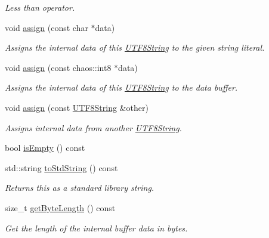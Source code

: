 \begin{DoxyCompactItemize}
\begin{DoxyCompactList}\small\item\em Less than operator. \end{DoxyCompactList}\item 
void \hyperlink{classchaos_1_1str_1_1_u_t_f8_string_a483e71ec1090e346c63bf2b13b37ad7a}{assign} (const char $\ast$data)
\begin{DoxyCompactList}\small\item\em Assigns the internal data of this \hyperlink{classchaos_1_1str_1_1_u_t_f8_string}{U\-T\-F8\-String} to the given string literal. \end{DoxyCompactList}\item 
void \hyperlink{classchaos_1_1str_1_1_u_t_f8_string_a861874ab4bff725c9c10b20a14533221}{assign} (const chaos\-::int8 $\ast$data)
\begin{DoxyCompactList}\small\item\em Assigns the internal data of this \hyperlink{classchaos_1_1str_1_1_u_t_f8_string}{U\-T\-F8\-String} to the data buffer. \end{DoxyCompactList}\item 
void \hyperlink{classchaos_1_1str_1_1_u_t_f8_string_aff351b1a6276e5e59717bc6c3b67818c}{assign} (const \hyperlink{classchaos_1_1str_1_1_u_t_f8_string}{U\-T\-F8\-String} \&other)
\begin{DoxyCompactList}\small\item\em Assigns internal data from another \hyperlink{classchaos_1_1str_1_1_u_t_f8_string}{U\-T\-F8\-String}. \end{DoxyCompactList}\item 
bool \hyperlink{classchaos_1_1str_1_1_u_t_f8_string_a6011a783e7fdc46a39996729651ccd76}{is\-Empty} () const 
\item 
std\-::string \hyperlink{classchaos_1_1str_1_1_u_t_f8_string_a4febd35eab6e30bbcf2bdf38097a2fd6}{to\-Std\-String} () const 
\begin{DoxyCompactList}\small\item\em Returns this as a standard library string. \end{DoxyCompactList}\item 
size\-\_\-t \hyperlink{classchaos_1_1str_1_1_u_t_f8_string_a848f2364bfff00544463f9f08748cdc2}{get\-Byte\-Length} () const 
\begin{DoxyCompactList}\small\item\em Get the length of the internal buffer data in bytes. \end{DoxyCompactList}\item 

\end{DoxyCompactItemize}
